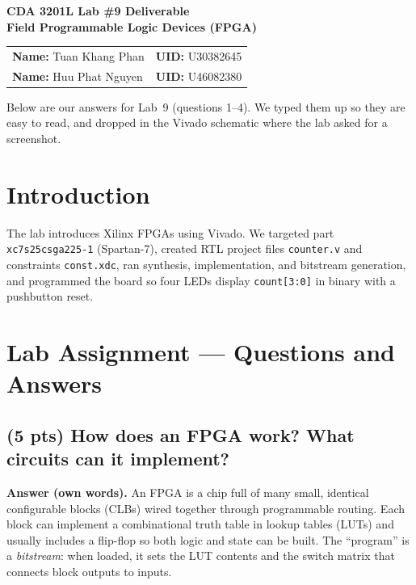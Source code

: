 \documentclass[12pt, letterpaper]{article}
\begin{document}
\begin{center}
  {\Large \textbf{CDA 3201L Lab \#9 Deliverable}}\\[10pt]
  {\large \textbf{Field Programmable Logic Devices (FPGA)}}\\[20pt]
  \begin{tabular}{ll}
    \textbf{Name:} Tuan Khang Phan & \textbf{UID:} U30382645 \\[4pt]
    \textbf{Name:} Huu Phat Nguyen & \textbf{UID:} U46082380 \\
  \end{tabular}
\end{center}

\noindent
Below are our answers for Lab~9 (questions 1--4).  We typed them up so they are easy to read,
and dropped in the Vivado schematic where the lab asked for a screenshot.

\section{Introduction}

The lab introduces Xilinx FPGAs using Vivado.  We targeted part \texttt{xc7s25csga225-1}
(Spartan-7), created RTL project files \texttt{counter.v} and constraints \texttt{const.xdc},
ran synthesis, implementation, and bitstream generation, and programmed the board so four LEDs
display \texttt{count[3:0]} in binary with a pushbutton reset.

\section{Lab Assignment --- Questions and Answers}

\subsection{(5 pts) How does an FPGA work?  What circuits can it implement?}

\textbf{Answer (own words).}  An FPGA is a chip full of many small, identical configurable
blocks (CLBs) wired together through programmable routing.  Each block can implement a
combinational truth table in lookup tables (LUTs) and usually includes a flip-flop so both
logic and state can be built.  The ``program'' is a \emph{bitstream}: when loaded, it sets
the LUT contents and the switch matrix that connects block outputs to inputs.
\end{document}
